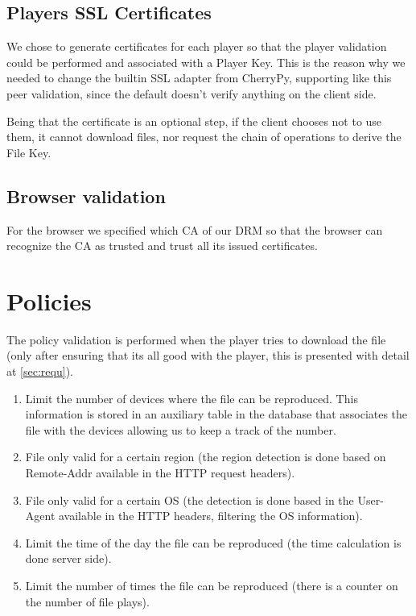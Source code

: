 \documentclass[11pt,a4paper]{report}
\begin{document}
\section{Players SSL Certificates}

We chose to generate certificates for each player so that the player validation could be performed and associated with a Player Key. This is the reason why we needed to change the builtin SSL adapter from CherryPy, supporting like this peer validation, since the default doesn't verify anything on the client side.

Being that the certificate is an optional step, if the client chooses not to use them, it cannot download files, nor request the chain of operations to derive the File Key.

\section{Browser validation}
For the browser we specified which CA of our DRM so that the browser can recognize the CA as trusted and trust all its issued certificates.

\chapter{Policies}
The policy validation is performed when the player tries to download the file (only after ensuring that its all good with the player, this is presented with detail at  \autoref{sec:requ}).
\begin{enumerate}
\item Limit the number of devices where the file can be reproduced. This information is stored in an auxiliary table in the database that associates the file with the devices allowing us to keep a track of the number.
\item File only valid for a certain region (the region detection is done based on Remote-Addr available in the HTTP request headers).
\item File only valid for a certain OS (the detection is done based in the User-Agent available in the HTTP headers, filtering the OS information).
\item Limit the time of the day the file can be reproduced (the time calculation is done server side).
\item Limit the number of times the file can be reproduced (there is a counter on the number of file plays).
\end{enumerate}
\end{document}
